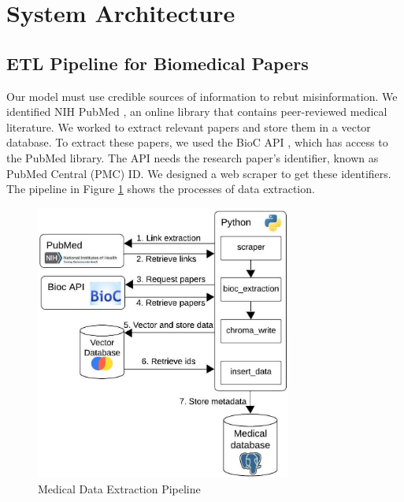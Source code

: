 
\section{System Architecture}


\subsection{ETL Pipeline for Biomedical Papers}

Our model must use credible sources of information to rebut misinformation. We identified NIH PubMed \cite{pubmed}, an online library that contains peer-reviewed medical literature. We worked to extract relevant papers and store them in a vector database. To extract these papers, we used the BioC API \cite{bioinformatics}, which has access to the PubMed library. The API needs the research paper's identifier, known as PubMed Central (PMC) ID. We designed a web scraper to get these identifiers. The pipeline in Figure \ref{fig:etl} shows the processes of data extraction. 

\begin{figure}[!htb]
	\begin{center}
		\includegraphics[width=0.75\textwidth]{figures/ETL_Pipeline.jpeg} %
	\end{center}
	\caption{Medical Data Extraction Pipeline} %
	\label{fig:etl}
\end{figure}

